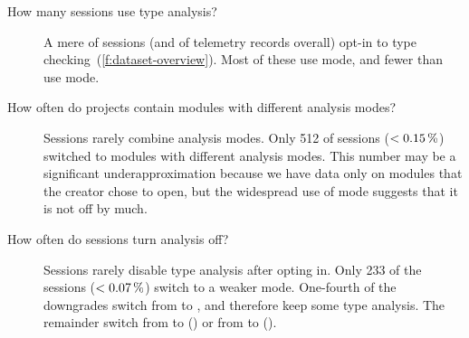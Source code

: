 \documentclass[english,submission,cleveref]{programming}
\begin{document}
\begin{description}
  \item[How many sessions use type analysis?]
    A mere  of sessions (and of telemetry records overall) opt-in to
    type checking~(\cref{f:dataset-overview}).
    Most of these use \mnonstrict{} mode, and fewer than 
    use \mstrict{} mode.

  \item[How often do projects contain modules with different analysis modes?]
    Sessions rarely combine analysis modes.
    Only 512 of  sessions ($<\SI{0.15}{\percent}$) switched to modules with different
    analysis modes.
    This number may be a significant underapproximation because we have data
    only on modules that the creator chose to open, but the widespread use
    of \mnocheck{} mode suggests that it is not off by much.

  \item[How often do sessions turn analysis off?]
    Sessions rarely disable type analysis after opting in.
    Only 233 of the  sessions ($<\SI{0.07}{\percent}$)
    switch to a weaker mode.
    One-fourth of the downgrades switch from \mstrict{}
    to \mnonstrict{}, and therefore keep some type analysis.
    The remainder switch from \mstrict{} to \mnocheck{} ()
    or from \mnonstrict{} to \mnocheck{} ().






\end{description}
\end{document}
